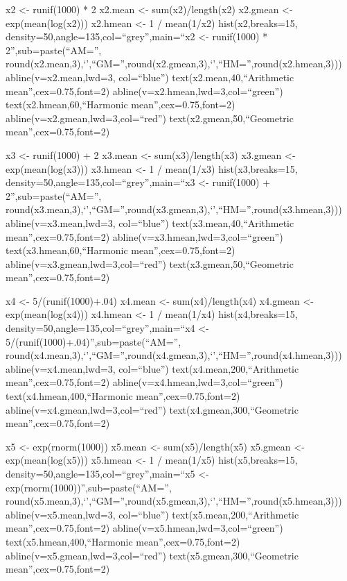 \documentclass[]{article}
\begin{document}
x2 \textless{}- runif(1000) * 2 x2.mean \textless{}- sum(x2)/length(x2)
x2.gmean \textless{}- exp(mean(log(x2))) x2.hmean \textless{}- 1 /
mean(1/x2) hist(x2,breaks=15,
density=50,angle=135,col=``grey'',main=``x2 \textless{}- runif(1000) *
2'',sub=paste(``AM='',
round(x2.mean,3),`\textbar{}',``GM='',round(x2.gmean,3),`\textbar{}',``HM='',round(x2.hmean,3)))
abline(v=x2.mean,lwd=3, col=``blue'') text(x2.mean,40,``Arithmetic
mean'',cex=0.75,font=2) abline(v=x2.hmean,lwd=3,col=``green'')
text(x2.hmean,60,``Harmonic mean'',cex=0.75,font=2)
abline(v=x2.gmean,lwd=3,col=``red'') text(x2.gmean,50,``Geometric
mean'',cex=0.75,font=2)

x3 \textless{}- runif(1000) + 2 x3.mean \textless{}- sum(x3)/length(x3)
x3.gmean \textless{}- exp(mean(log(x3))) x3.hmean \textless{}- 1 /
mean(1/x3) hist(x3,breaks=15,
density=50,angle=135,col=``grey'',main=``x3 \textless{}- runif(1000) +
2'',sub=paste(``AM='',
round(x3.mean,3),`\textbar{}',``GM='',round(x3.gmean,3),`\textbar{}',``HM='',round(x3.hmean,3)))
abline(v=x3.mean,lwd=3, col=``blue'') text(x3.mean,40,``Arithmetic
mean'',cex=0.75,font=2) abline(v=x3.hmean,lwd=3,col=``green'')
text(x3.hmean,60,``Harmonic mean'',cex=0.75,font=2)
abline(v=x3.gmean,lwd=3,col=``red'') text(x3.gmean,50,``Geometric
mean'',cex=0.75,font=2)

x4 \textless{}- 5/(runif(1000)+.04) x4.mean \textless{}-
sum(x4)/length(x4) x4.gmean \textless{}- exp(mean(log(x4))) x4.hmean
\textless{}- 1 / mean(1/x4) hist(x4,breaks=15,
density=50,angle=135,col=``grey'',main=``x4 \textless{}-
5/(runif(1000)+.04)'',sub=paste(``AM='',
round(x4.mean,3),`\textbar{}',``GM='',round(x4.gmean,3),`\textbar{}',``HM='',round(x4.hmean,3)))
abline(v=x4.mean,lwd=3, col=``blue'') text(x4.mean,200,``Arithmetic
mean'',cex=0.75,font=2) abline(v=x4.hmean,lwd=3,col=``green'')
text(x4.hmean,400,``Harmonic mean'',cex=0.75,font=2)
abline(v=x4.gmean,lwd=3,col=``red'') text(x4.gmean,300,``Geometric
mean'',cex=0.75,font=2)

x5 \textless{}- exp(rnorm(1000)) x5.mean \textless{}- sum(x5)/length(x5)
x5.gmean \textless{}- exp(mean(log(x5))) x5.hmean \textless{}- 1 /
mean(1/x5) hist(x5,breaks=15,
density=50,angle=135,col=``grey'',main=``x5 \textless{}-
exp(rnorm(1000))'',sub=paste(``AM='',
round(x5.mean,3),`\textbar{}',``GM='',round(x5.gmean,3),`\textbar{}',``HM='',round(x5.hmean,3)))
abline(v=x5.mean,lwd=3, col=``blue'') text(x5.mean,200,``Arithmetic
mean'',cex=0.75,font=2) abline(v=x5.hmean,lwd=3,col=``green'')
text(x5.hmean,400,``Harmonic mean'',cex=0.75,font=2)
abline(v=x5.gmean,lwd=3,col=``red'') text(x5.gmean,300,``Geometric
mean'',cex=0.75,font=2)
\end{document}
